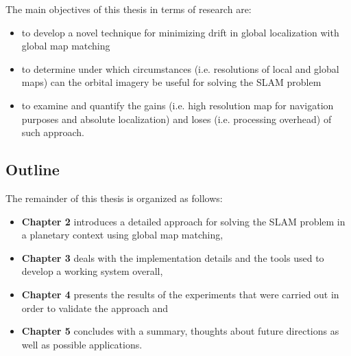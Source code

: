 The main objectives of this thesis in terms of research are:

\begin{itemize}
    \item to develop a novel technique for minimizing drift in global
        localization with global map matching
    \item to determine under which circumstances (i.e. resolutions of
        local and global maps) can the orbital imagery be useful for
        solving the SLAM problem
    \item to examine and quantify the gains (i.e. high resolution map for
        navigation purposes and absolute localization) and loses
        (i.e. processing overhead) of such approach.
\end{itemize}

\subsection{Outline}

The remainder of this thesis is organized as follows:
\begin{itemize}
    \item \textbf{Chapter 2} introduces a detailed approach for solving the
        SLAM problem in a planetary context using global map matching,
    \item \textbf{Chapter 3} deals with the implementation details and
        the tools used to develop a working system overall,
    \item \textbf{Chapter 4} presents the results of the experiments that
        were carried out in order to validate the approach and
    \item \textbf{Chapter 5} concludes with a summary, thoughts about future
        directions as well as possible applications.
\end{itemize}

